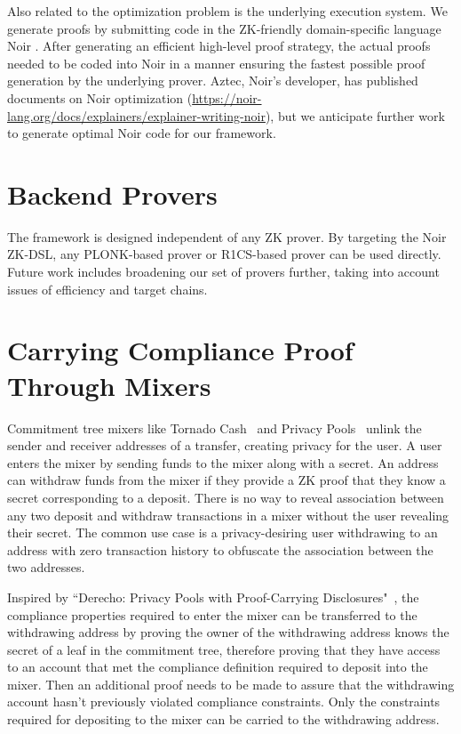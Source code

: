 \documentclass[9pt]{extreport}
\begin{document}
Also related to the optimization problem is the underlying execution system.  We generate proofs by
submitting code in the ZK-friendly domain-specific language Noir \cite{AztecNoir22}. After generating an efficient high-level proof strategy, the actual proofs needed to be coded into Noir in a manner ensuring the fastest possible proof generation by the underlying prover.  Aztec, Noir's developer, has published documents on Noir optimization (\url{https://noir-lang.org/docs/explainers/explainer-writing-noir}), but we anticipate further work to generate optimal Noir code for our framework.

\section{Backend Provers}
The framework is designed independent of any ZK prover.  By targeting the Noir ZK-DSL, any PLONK-based prover or R1CS-based prover can be used directly.  Future work includes broadening our set of provers further, taking into account issues of efficiency and target chains.

\section{Carrying Compliance Proof Through Mixers}
Commitment tree mixers like Tornado Cash~\cite{tornadocash} and Privacy Pools~\cite{buterin2023blockchain} unlink the sender and receiver addresses of a transfer, creating privacy for the user.  A user enters the mixer by sending funds to the mixer along with a secret.  An address can withdraw funds from the mixer if they provide a ZK proof that they know a secret corresponding to a deposit.  There is no way to reveal association between any two deposit and withdraw transactions in a mixer without the user revealing their secret.  The common use case is a privacy-desiring user withdrawing to an address with zero transaction history to obfuscate the association between the two addresses.

Inspired by ``Derecho: Privacy Pools with Proof-Carrying Disclosures"~\cite{10.1145/3658644.3670270}, the compliance properties required to enter the mixer can be transferred to the withdrawing address by proving the owner of the withdrawing address knows the secret of a leaf in the commitment tree, therefore proving that they have access to an account that met the compliance definition required to deposit into the mixer.  Then an additional proof needs to be made to assure that the withdrawing account hasn't previously violated compliance constraints.  Only the constraints required for depositing to the mixer can be carried to the withdrawing address.
\end{document}
